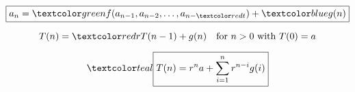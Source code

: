 
\begin{frame}{}
  \[
    \boxed{a_n = \green{f}(a_{n-1}, a_{n-2}, \ldots, a_{n-\red{t}}) + \blue{g(n)}}
  \]

  \pause
\end{frame}

% 
% 
% 
% 
% 

\begin{frame}{}
  \begin{theorem}
    \[
      T(n) = \red{r} T(n-1) + g(n) \quad \text{for } n > 0 \text{ with } T(0) = a
    \]

    \vspace{0.30cm}
    \[
      \teal{\boxed{T(n) = r^n a + \sum_{i=1}^{n} r^{n-i} g(i)}}
    \]
  \end{theorem}
\end{frame}

